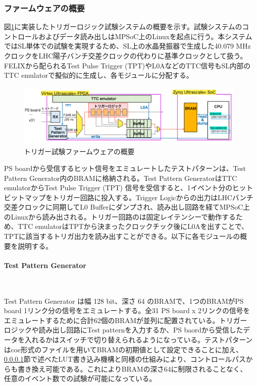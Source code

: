 \subsubsection*{ファームウェアの概要}
図\ref{TestSystem_Overview}に実装したトリガーロジック試験システムの概要を示す。試験システムのコントロールおよびデータ読み出しはMPSoC上のLinuxを起点に行う。本システムではSL単体での試験を実現するため、SL上の水晶発振器で生成した40.079 MHzクロックをLHC陽子バンチ交差クロックの代わりに基準クロックとして扱う。FELIXから配られるTest Pulse Trigger (TPT)やL0AなどのTTC信号もSL内部のTTC emulatorで擬似的に生成し、各モジュールに分配する。

\begin{figure} 
\centering
\includegraphics[width=16cm]{fig/Test/TestSystem_overview.png}
\caption[トリガー試験ファームウェアの概要]{トリガー試験ファームウェアの概要}
\label{TestSystem_Overview}
\end{figure}

PS boardから受信するヒット信号をエミュレートしたテストパターンは、Test Pattern Generator内のBRAMに格納される。Test Pattern GeneratorはTTC emulatorからTest Pulse Trigger (TPT) 信号を受信すると、1イベント分のヒットビットマップをトリガー回路に投入する。Trigger Logicからの出力はLHCバンチ交差クロックに同期してL0 Bufferにダンプされ、読み出し回路を経てMPSoC上のLinuxから読み出される。トリガー回路のは固定レイテンシーで動作するため、TTC emulatorはTPTから決まったクロックチック後にL0Aを出すことで、TPTに該当するトリガ出力を読み出すことができる。以下に各モジュールの概要を説明する。

\paragraph{Test Pattern Generator}　　
\par
Test Pattern Generator は幅 128 bit、深さ 64 のBRAMで、1つのBRAMがPS board 1リンク分の信号をエミュレートする。全31 PS board x 2リンクの信号をエミュレートするために合計62個のBRAMが並列に配置されている。トリガーロジックや読み出し回路にTest patternを入力するか、PS baordから受信したデータを入れるかはスイッチで切り替えられるようになっている。テストパターンはcoe形式のファイルを用いてBRAMの初期値として設定できることに加え、\ref{}節で述べたLUT書き込み機構と同様の仕組みにより、コントロールパスからも書き換え可能である。これによりBRAMの深さ64に制限されることなく、任意のイベント数での試験が可能になっている。

